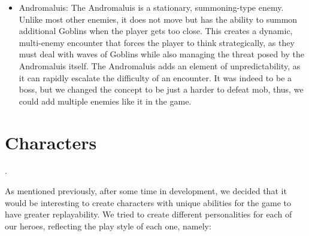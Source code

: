 \documentclass[a4paper,12pt]{article}
\begin{document}
\begin{itemize}
  \item Andromaluis: The Andromaluis is a stationary, summoning-type enemy. Unlike most other enemies, it does not move but has the ability to summon additional Goblins when the player gets too close. This creates a dynamic, multi-enemy encounter that forces the player to think strategically, as they must deal with waves of Goblins while also managing the threat posed by the Andromaluis itself. The Andromaluis adds an element of unpredictability, as it can rapidly escalate the difficulty of an encounter. It was indeed to be a boss, but we changed the concept to be just a harder to defeat mob, thus, we could add multiple enemies like it in the game.
\end{itemize}

\section*{Characters}
.

As mentioned previously, after some time in development, we decided that it would be interesting to create characters with unique abilities for the game to have greater replayability. We tried to create different personalities for each of our heroes, reflecting the play style of each one, namely:
\end{document}
